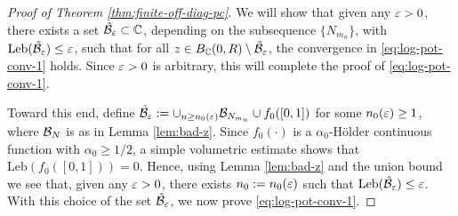 \documentclass{amsart}
\numberwithin{equation}{section}
\def\corOZ{}
\begin{document}
\begin{proof}[Proof of Theorem \ref{thm:finite-off-diag-pc}]
We will show that given any $\varepsilon >0$, there exists a set $\corOZ{\hat \cN_\vep} \subset \C$, depending on the subsequence $\{N_{m_n}\}$, with
$\mathrm{Leb}(\corOZ{\hat \cN_\vep})
\le \vep$, such that for all $z \in B_\C(0,R)\setminus \corOZ{\hat \cN_\vep}$,
the convergence in \eqref{eq:log-pot-conv-1} holds. Since $\varepsilon>0$ is arbitrary, this will complete the proof of  \eqref{eq:log-pot-conv-1}.

\corOZ{Toward this end,}
define
$\corOZ{\hat \cN_\vep}:=\cup_{n \ge \corOZ{n_0(\vep)}} \cN_{N_{m_n}} \cup f_0([0,1])$ for some $n_0(\varepsilon) \ge 1$,
\corOZ{where $\mathcal{B}_N$ is as in Lemma \ref{lem:bad-z}}.
\corOZ{Since} $f_0(\cdot)$ is a $\alpha_0$-H\"{o}lder continuous function
with $\alpha_0 \ge 1/2$, a simple volumetric estimate shows that $\mathrm{Leb}(f_0([0,1]))=0$. Hence, using Lemma \ref{lem:bad-z} and the union bound we see that, given any $\varepsilon >0$, there exists $n_0:=n_0(\varepsilon)$ such
that $\mathrm{Leb}(\corOZ{\hat \cN_\vep}) \le \vep$.
With this choice of
the set
$\corOZ{\hat \cN_\vep}$, we now prove \eqref{eq:log-pot-conv-1}.


\end{proof}
\end{document}
